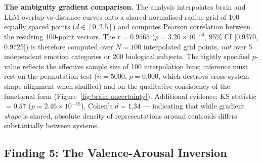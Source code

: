 \documentclass{article}
\begin{document}
\textbf{The ambiguity gradient comparison.}
The analysis interpolates brain and LLM overlap-vs-distance curves onto a shared
normalised-radius grid of 100 equally spaced points ($\tilde{d}\in[0, 2.5]$) and
computes Pearson correlation between the resulting 100-point vectors.
The $r\!=\!0.9565$ ($p\!=\!3.20\!\times\!10^{-54}$, 95\% CI [0.9370, 0.9725]) is
therefore computed over $N\!=\!100$ interpolated grid points, \emph{not} over 5
independent emotion categories or 200 biological subjects.
The tightly specified $p$-value reflects the effective sample size of 100 interpolation
bins; inference must rest on the permutation test ($n\!=\!5000$, $p\!=\!0.000$, which
destroys cross-system shape alignment when shuffled) and on the qualitative consistency
of the functional form (Figure~\ref{fig:brain-uncertainty}).
Additional evidence: KS statistic $= 0.57$ ($p\!=\!2.46\!\times\!10^{-15}$), Cohen's
$d\!=\!1.34$ --- indicating that while gradient \emph{shape} is shared, absolute
density of representations around centroids differs substantially between systems.

\subsection{Finding 5: The Valence-Arousal Inversion}
\label{sec:inversion}
\end{document}
